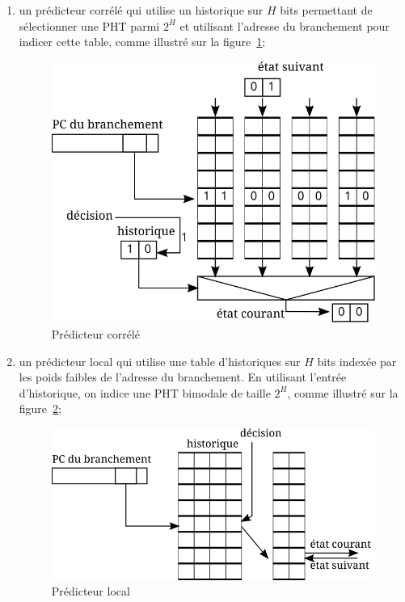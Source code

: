 \documentclass[a4paper]{article}
\begin{document}
\begin{enumerate}
\item un prédicteur corrélé qui utilise un historique sur $H$ bits permettant de sélectionner une PHT parmi $2^H$ et utilisant l'adresse du branchement pour indicer cette table, comme illustré sur la figure~\ref{correlated};
      \begin{figure}[hbt]\center\leavevmode
      \includegraphics[scale=.9]{correlated}
      \caption{\label{correlated}Prédicteur corrélé}
      \end{figure}

\item un prédicteur local qui utilise une table d'historiques sur $H$ bits indexée par les poids faibles de l'adresse du branchement.  En utilisant l'entrée d'historique, on indice une PHT bimodale de taille $2^H$, comme illustré sur la figure~\ref{local};
      \begin{figure}[hbt]\center\leavevmode
      \includegraphics[scale=.9]{local}
      \caption{Prédicteur local}
      \label{local}
      \end{figure}


\end{enumerate}
\end{document}
